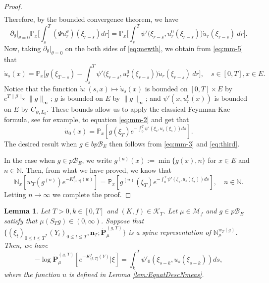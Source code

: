 \documentclass[UTF8]{pkuthss}
\theoremstyle{plain}
\newtheorem{lem}[thm]{Lemma}
\theoremstyle{definition}
\numberwithin{equation}{section}
\begin{document}
\begin{proof}
\[\begin{split}
\end{split}\]
	Therefore, by the bounded convergence theorem, we have
\begin{equation}
\label{eq:mm-5}
\partial_\theta|_{\theta =0} \mathbb P_x \Big[ \int_s^T (\Psi u_r^\theta)(\xi_{r-s}) dr\Big]
	= \mathbb P_x \Big[ \int_s^T \psi'\big(\xi_{r-s},u_r^0(\xi_{r-s})\big) \dot u_r(\xi_{r-s})~dr \Big].
\end{equation}
	Now, taking $\partial_\theta|_{\theta=0}$ on the both sides of \eqref{eq:mewth}, we obtain from \eqref{eq:mm-5} that
\begin{equation}\label{eq:mm-2}
	\dot u_s (x)
	= \mathbb P_x\Big[ g(\xi_{T-s})- \int_s^T \psi'\big(\xi_{r-s},u_r^0(\xi_{r-s})\big) \dot u_r(\xi_{r-s})~ dr \Big],
	\quad s\in [0,T], x\in E.
\end{equation}
	Notice that the function $\dot u:(s,x) \mapsto \dot u_s(x)$ is bounded on $[0,T] \times E$ by $e^{T \|\beta\|_\infty} \|g\|_\infty$;
	$g$ is bounded on $E$ by $\|g\|_\infty$;
	and $\psi'(x, u_r^0(x))$ is bounded on $E$ by $C_{\psi,L_0}$.
	These bounds allow us to apply the classical Feynman-Kac formula, see \cite[Lemma A.1.5]{Dynkin1993Superprocesses} for example, to equation \eqref{eq:mm-2} and get that
\begin{equation}\label{eq:third}
	\dot u_0(x)
	=  \mathbb P_{x} [g(\xi_T) e^{-\int_0^T \psi'(\xi_s,u_s(\xi_s)) ds}].
\end{equation}
	The desired result when $g \in bp\mathscr B_E$ then follows from \eqref{eq:mm-3} and \eqref{eq:third}.
\par
	In the case when $g \in p\mathscr B_E$, we write $g^{(n)}(x) := \min\{g(x), n\}$ for $x \in E$ and $n \in \mathbb N$.
	Then, from what we have proved, we know that
\[
	\mathbb N_x[w_T(g^{(n)}) e^{- K_{(0,T]}^f(w)}]
	= {\mathbb P_x[g^{(n)}(\xi_T) e^{-\int_0^T \psi'(\xi_s,u_s(\xi_s))ds}]},
	\quad n \in \mathbb N.
\]
	Letting $n \to \infty$ we complete the proof.
\end{proof}
\begin{lem}\label{lem:spinImigrCondSpin}
 Let $T>0, k\in[0, T]$ and $(K,f) \in \mathcal K_T$. Let $\mu\in \mathcal M_f$ and $g\in p\mathscr B_E$ satisfy that $\mu(S_Tg) \in (0,\infty)$. Suppose that $\{(\xi_t)_{0\leq t\leq T}, (Y_t)_{0\leq t\leq T}, \mathbf n_T; \dot {\mathbf P}^{(g,T)}_\mu\}$ is a spine representation of $\mathbb N_\mu^{w_T(g)}$.
	Then, we have
\begin{equation}\label{eq:spinImigrCondSpin}
    -\log \dot{\mathbf P}^{(g,T)}_\mu[e^{-K^f_{(k, T]}(Y)}|\xi]
	=\int_k^T \psi'_0(\xi_{s-k},u_s(\xi_{s-k})) ds,
\end{equation}
	where the function $u$ is defined in Lemma \ref{lem:EquatDescNmeas}.
\end{lem}
\end{document}
